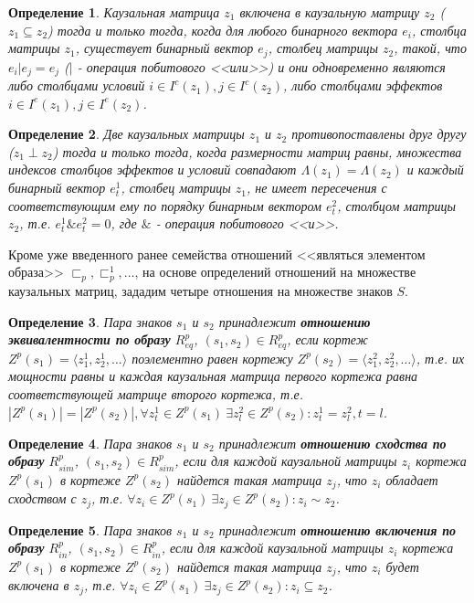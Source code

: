 \documentclass[12pt]{scrartcl}
\newtheorem{definition}{Определение}
\begin{document}
	\begin{definition}
		Каузальная матрица $z_1$ включена в каузальную матрицу $z_2$ ($z_1\subseteq z_2$) тогда и только тогда, когда  для любого бинарного вектора $e_i$, столбца матрицы $z_1$, существует бинарный вектор $e_j$, столбец матрицы $z_2$, такой, что $e_i | e_j=e_j$ ($|$ - операция побитового <<или>>) и они одновременно являются либо столбцами условий $i\in I^c(z_1), j\in I^c(z_2)$, либо столбцами эффектов $i\in I^e(z_1), j\in I^e(z_2)$.
	\end{definition}
	
	\begin{definition}
		Две каузальных матрицы $z_1$ и $z_2$ противопоставлены друг другу ($z_1\perp z_2$) тогда и только тогда, когда размерности матриц равны, множества индексов столбцов эффектов и условий совпадают $\Lambda({z_1})=\Lambda({z_2})$ и каждый бинарный вектор $e_t^1$, столбец матрицы $z_1$, не имеет пересечения с соответствующим ему по порядку бинарным вектором $e_t^2$, столбцом матрицы $z_2$, т.е. $e_t^1\& e_t^2=0$, где $\&$ - операция побитового <<и>>.
	\end{definition}
	
	Кроме уже введенного ранее семейства отношений <<являться элементом образа>> ${\sqsubset_p, \sqsubset_p^1, \dots}$, на основе определений отношений на множестве каузальных матриц, зададим четыре отношения на множестве знаков $S$.
	\begin{definition}
		Пара знаков  $s_1$ и $s_2$ принадлежит \textbf{отношению эквивалентности по образу} $R_{eq}^p$, $(s_1,s_2)\in R_{eq}^p$, если кортеж $Z^p(s_1)=\langle z_1^1,z_2^1,\dots\rangle$ поэлементно равен кортежу $Z^p(s_2)=\langle z_1^2,z_2^2,\dots\rangle$, т.е. их мощности равны и каждая каузальная матрица первого кортежа равна соответствующей матрице второго кортежа, т.е. $|Z^p(s_1)| = |Z^p(s_2)|, \forall z_t^1\in Z^p(s_1)\ \exists z_l^2\in Z^p(s_2): z_t^1=z_l^2, t=l$.
	\end{definition}
	
	\begin{definition}\label{def:sim}
		Пара знаков  $s_1$ и $s_2$ принадлежит \textbf{отношению сходства по образу} $R_{sim}^p$, $(s_1,s_2)\in R_{sim}^p$, если для каждой каузальной матрицы $z_i$ кортежа $Z^p(s_1)$ в кортеже $Z^p(s_2)$ найдется такая матрица $z_j$, что $z_i$ обладает сходством с $z_j$, т.е. $\forall z_i\in Z^p(s_1)\ \exists z_j\in Z^p(s_2): z_i\sim z_2$.
	\end{definition}
	
	\begin{definition}
		Пара знаков  $s_1$ и $s_2$ принадлежит \textbf{отношению включения по образу} $R_{in}^p$, $(s_1,s_2)\in R_{in}^p$, если для каждой каузальной матрицы $z_i$ кортежа $Z^p(s_1)$ в кортеже $Z^p(s_2)$ найдется такая матрица $z_j$, что $z_i$ будет включена в $z_j$, т.е. $\forall z_i\in Z^p(s_1)\ \exists z_j\in Z^p(s_2): z_i\subseteq z_2$.
	\end{definition}
\end{document}
